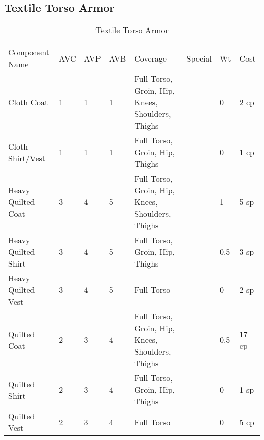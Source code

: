 \documentclass[oneside,11pt,english]{book}
\begin{document}
\subsection{Textile Torso Armor}
\begin{longtabu} to 
	\captionsetup{textformat=empty, labelformat=blank}
	\caption{Textile Torso Armor} \vspace{-15pt}
	\label{tab:Textile Torso Armor}\\
Component Name&AVC&AVP&AVB& Coverage& Special& Wt&Cost\\\toprule
Cloth Coat& 1& 1& 1& Full Torso, Groin, Hip, Knees, Shoulders, Thighs& & 0& 2 cp\\
Cloth Shirt/Vest& 1& 1& 1& Full Torso, Groin, Hip, Thighs& & 0& 1 cp\\
Heavy Quilted Coat& 3& 4& 5& Full Torso, Groin, Hip, Knees, Shoulders, Thighs& & 1& 5 sp\\
Heavy Quilted Shirt& 3& 4& 5& Full Torso, Groin, Hip, Thighs& & 0.5& 3 sp\\
Heavy Quilted Vest& 3& 4& 5& Full Torso& & 0& 2 sp\\
Quilted Coat& 2& 3& 4& Full Torso, Groin, Hip, Knees, Shoulders, Thighs& & 0.5& 17 cp\\
Quilted Shirt& 2& 3& 4& Full Torso, Groin, Hip, Thighs& & 0& 1 sp\\
Quilted Vest& 2& 3& 4& Full Torso& & 0& 5 cp\\
\end{longtabu}
\end{document}
